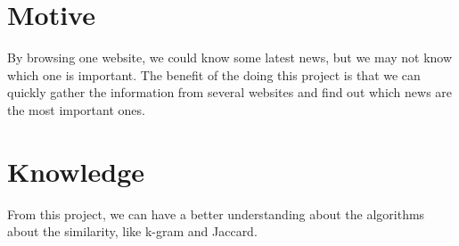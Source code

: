 \documentclass[11pt]{article}
\begin{document}
\section{Motive}
By browsing one website, we could know some latest news, but we may not know which one is important. The benefit of the doing this project is that we can quickly gather the information from several websites and find out which news are the most important ones.

\section{Knowledge}
From this project, we can have a better understanding about the algorithms about the similarity, like k-gram and Jaccard.
\end{document}
